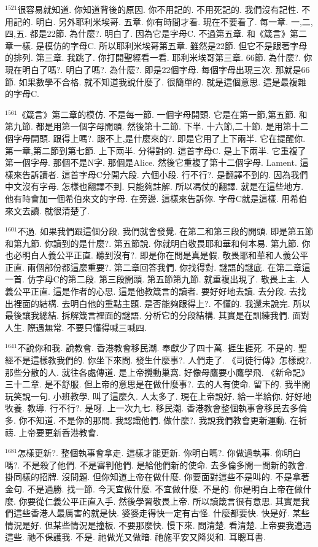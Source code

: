 \documentclass{book}
\begin{document}
$^{1521}$很容易就知道.
你知道背後的原因.
你不用記的.
不用死記的.
我們沒有記性.
不用記的.
明白.
另外耶利米埃哥.
五章.
你有時間才看.
現在不要看了.
每一章.
一,二,四,五.
都是22節.
為什麼?.
明白了.
因為它是字母C.
不過第五章.
和《箴言》第二章一樣.
是模仿的字母C.
所以耶利米埃哥第五章.
雖然是22節.
但它不是跟著字母的排列.
第三章.
我跳了.
你打開聖經看一看.
耶利米埃哥第三章.
66節.
為什麼?.
你現在明白了嗎?.
明白了嗎?.
為什麼?.
即是22個字母.
每個字母出現三次.
那就是66節.
如果數學不合格.
就不知道我說什麼了.
很簡單的.
就是這個意思.
這是最複雜的字母C.

$^{1561}$《箴言》第二章的模仿.
不是每一節.
一個字母開頭.
它是在第一節,第五節.
和第九節.
都是用第一個字母開頭.
然後第十二節.
下半.
十六節,二十節.
是用第十二個字母開頭.
跟得上嗎?.
跟不上,是什麼來的?.
即是它用了上下兩半.
它在提醒你.
第一章,第二節到第七節.
上下兩半.
分得對的.
這首字母C.
是上下兩半.
它重複了第一個字母.
那個不是N字.
那個是Alice.
然後它重複了第十二個字母.
Lament.
這樣來告訴讀者.
這首字母C分開六段.
六個小段.
行不行?.
是翻譯不到的.
因為我們中文沒有字母.
怎樣也翻譯不到.
只能夠註解.
所以馮仗的翻譯.
就是在這些地方.
他有時會加一個希伯來文的字母.
在旁邊.
這樣來告訴你.
字母C就是這樣.
用希伯來文去讀.
就很清楚了.

$^{1601}$不過.
如果我們跟這個分段.
我們就會發覺.
在第二和第三段的開頭.
即是第五節和第九節.
你讀到的是什麼?.
第五節說.
你就明白敬畏耶和華和何本易.
第九節.
你也必明白人義公平正直.
聽到沒有?.
即是你在問是真是假.
敬畏耶和華和人義公平正直.
兩個部份都這麼重要?.
第二章回答我們.
你找得對.
謎語的謎底.
在第二章這一首.
仿字母C的第二段.
第三段開頭.
第五節第九節.
就重複出現了.
敬畏上主.
人義公平正直.
這是作者的心思.
這是他教箴言的讀者.
要好好地去讀.
去分段.
去找出裡面的結構.
去明白他的重點主題.
是否能夠跟得上?.
不懂的.
我還未說完.
所以最後讓我總結.
拆解箴言裡面的謎語.
分析它的分段結構.
其實是在訓練我們.
面對人生.
際遇無常.
不要只懂得喊三喊四.

$^{1641}$不說你和我.
說教會.
香港教會移民潮.
奉獻少了四十萬.
捱生捱死.
不是的.
聖經不是這樣教我們的.
你坐下來問.
發生什麼事?.
人們走了.
《司徒行傳》怎樣說?.
那些分散的人.
就往各處傳道.
是上帝攪動巢窩.
好像母鷹要小鷹學飛.
《新命記》三十二章.
是不舒服.
但上帝的意思是在做什麼事?.
去的人有使命.
留下的.
我半開玩笑說一句.
小班教學.
叫了這麼久.
人太多了.
現在上帝說好.
給一半給你.
好好地牧養.
教導.
行不行?.
是呀.
上一次九七.
移民潮.
香港教會整個執事會移民去多倫多.
你不知道.
不是你的那間.
我認識他們.
做什麼?.
我說我們教會更新運動.
在祈禱.
上帝要更新香港教會.

$^{1681}$怎樣更新?.
整個執事會拿走.
這樣才能更新.
你明白嗎?.
你做過執事.
你明白嗎?.
不是殺了他們.
不是審判他們.
是給他們新的使命.
去多倫多開一間新的教會.
掛同樣的招牌.
沒問題.
但你知道上帝在做什麼.
你要面對這些不是叫的.
不是拿著金句.
不是通勝.
找一節.
今天宜做什麼.
不宜做什麼.
不是的.
你是明白上帝在做什麼.
你要從仁義公平正直入手.
然後學習敬畏上帝.
所以讀箴言很有意思.
其實是我們這些香港人最厲害的就是快.
婆婆走得快一定有古怪.
什麼都要快.
快是好.
某些情況是好.
但某些情況是撞板.
不要那麼快.
慢下來.
問清楚.
看清楚.
上帝要我遭遇這些.
祂不保護我.
不是.
祂做光又做暗.
祂施平安又降災和.
耳聰耳書.
\end{document}

